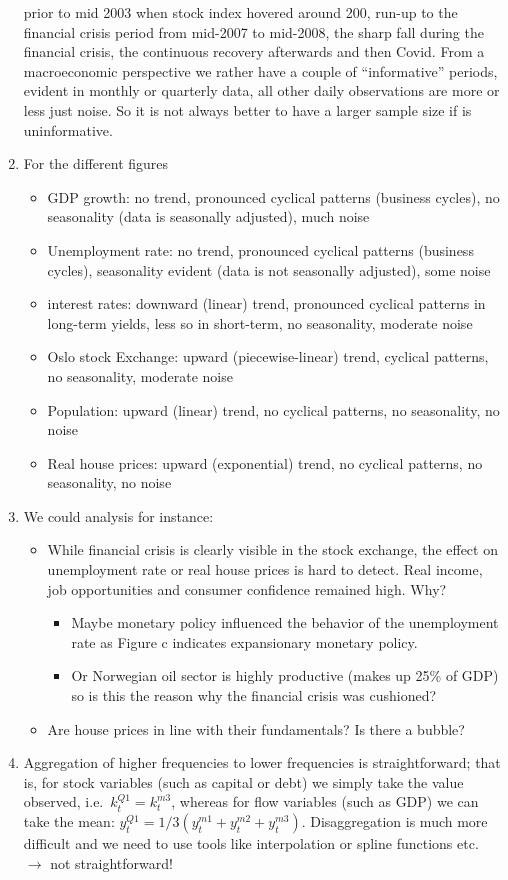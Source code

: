 \begin{enumerate}
  prior to mid 2003 when stock index hovered around 200,
  run-up to the financial crisis period from mid-2007 to mid-2008,
  the sharp fall during the financial crisis,
  the continuous recovery afterwards
  and then Covid.
From a macroeconomic perspective we rather have a couple of \enquote{informative} periods, evident in monthly or quarterly data,
  all other daily observations are more or less just noise.
So it is not always better to have a larger sample size if is uninformative.
\item For the different figures
\begin{itemize}
    \item GDP growth: no trend, pronounced cyclical patterns (business cycles), no seasonality (data is seasonally adjusted), much noise
    \item Unemployment rate: no trend, pronounced cyclical patterns (business cycles), seasonality evident (data is not seasonally adjusted), some noise
    \item interest rates: downward (linear) trend, pronounced cyclical patterns in long-term yields, less so in short-term, no seasonality, moderate noise
    \item Oslo stock Exchange: upward (piecewise-linear) trend, cyclical patterns, no seasonality, moderate noise
    \item Population: upward (linear) trend, no cyclical patterns, no seasonality, no noise
    \item Real house prices: upward (exponential) trend, no cyclical patterns, no seasonality, no noise
\end{itemize}
\item We could analysis for instance:
    \begin{itemize}
        \item While financial crisis is clearly visible in the stock exchange,
          the effect on unemployment rate or real house prices is hard to detect.
        Real income, job opportunities and consumer confidence remained high. Why?
        \begin{itemize} 
            \item Maybe monetary policy influenced the behavior of the unemployment rate as Figure c indicates expansionary monetary policy.
            \item Or Norwegian oil sector is highly productive (makes up 25\% of GDP) so is this the reason why the financial crisis was cushioned?
        \end{itemize}
        \item Are house prices in line with their fundamentals? Is there a bubble?
    \end{itemize}
\item Aggregation of higher frequencies to lower frequencies is straightforward;
  that is, for stock variables (such as capital or debt) we simply take the value observed, i.e.\
  \(k_t^{Q1} = k_t^{m3}\),
  whereas for flow variables (such as GDP) we can take the mean: \(y_t^{Q1} = 1/3 (y_t^{m1}+y_t^{m2}+y_t^{m3})\).
Disaggregation is much more difficult and we need to use tools like interpolation or spline functions etc.\
  \(\rightarrow \) not straightforward!
\end{enumerate}